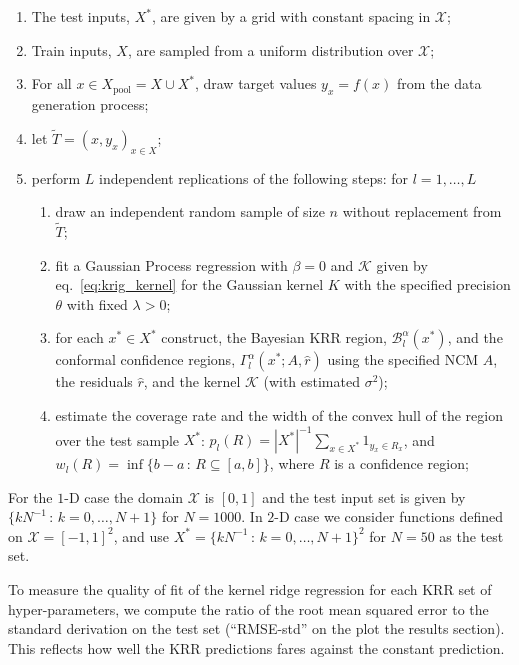 \documentclass[a4paper,14pt]{extarticle}
\newcommand{\Bcal}{\mathcal{B}}
\newcommand{\Kcal}{\mathcal{K}}
\newcommand{\Xcal}{\mathcal{X}}
\begin{document}
\begin{enumerate}
  \item The test inputs, $X^*$, are given by a grid with constant spacing in $\Xcal$;
  \item Train inputs, $X$, are sampled from a uniform distribution over $\Xcal$;
  \item For all $x\in X_{\text{pool}} = X \cup X^*$, draw target values $y_x = f(x)$
  from the data generation process;
  \item let $\tilde{T} = (x, y_x)_{x\in X}$;
  \item perform $L$ independent replications of the following steps: for $l=1,\ldots, L$
  \begin{enumerate}
    \item draw an independent random sample of size $n$ without replacement from $\tilde{T}$;
    \item fit a Gaussian Process regression with $\beta = 0$ and $\Kcal$ given by
    eq.~\ref{eq:krig_kernel} for the Gaussian kernel $K$ with the specified precision
    $\theta$ with fixed $\lambda > 0$;
    \item for each $x^* \in X^*$ construct, the Bayesian KRR region, $\Bcal_l^\alpha(x^*)$,
    and the conformal confidence regions, $\Gamma_l^\alpha(x^*; A, \hat{r})$ using
    the specified NCM $A$, the residuals $\hat{r}$, and the kernel $\Kcal$ (with
    estimated $\sigma^2$);
    \item estimate the coverage rate and the width of the convex hull of the region
    over the test sample $X^*$: $p_l(R) = |X^*|^{-1}\sum_{x\in X^*} 1_{y_x\in R_x}$,
    and $w_l(R) = \inf\{b-a\,:\,R \subseteq [a, b]\}$, where $R$ is a confidence
    region;
  \end{enumerate}
\end{enumerate}
For the $1$-D case the domain $\Xcal$ is $[0,1]$ and the test input set is given by
$\{k N^{-1}\,:\,k=0,\ldots, N+1\}$ for $N=1000$. In $2$-D case we consider functions
defined on $\Xcal=[-1,1]^2$, and use $X^* = \{k N^{-1}\,:\,k=0,\ldots, N+1\}^2$
for $N=50$ as the test set.

To measure the quality of fit of the kernel ridge regression for each KRR set of
hyper-parameters, we compute the ratio of the root mean squared error to the standard
derivation on the test set (``RMSE-std'' on the plot the results section). This
reflects how well the KRR predictions fares against the constant prediction.

\end{document}
